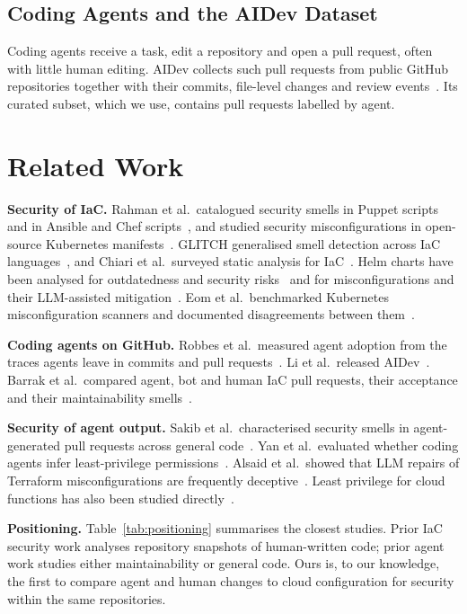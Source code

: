 \documentclass[10pt,conference]{IEEEtran}
\begin{document}
\subsection{Coding Agents and the AIDev Dataset}
Coding agents receive a task, edit a repository and open a pull request, often with little human editing. AIDev collects such pull requests from public GitHub repositories together with their commits, file-level changes and review events~\cite{li2026aidev}. Its curated subset, which we use, contains \NaidevTotal{} pull requests labelled by agent.

\section{Related Work}
\textbf{Security of IaC.} Rahman et al.\ catalogued security smells in Puppet scripts~\cite{rahman2019sins} and in Ansible and Chef scripts~\cite{rahman2021ansible}, and studied security misconfigurations in open-source Kubernetes manifests~\cite{rahman2023k8s}. GLITCH generalised smell detection across IaC languages~\cite{saavedra2022glitch}, and Chiari et al.\ surveyed static analysis for IaC~\cite{chiari2022survey}. Helm charts have been analysed for outdatedness and security risks~\cite{zerouali2023helm} and for misconfigurations and their LLM-assisted mitigation~\cite{minna2025helm}. Eom et al.\ benchmarked Kubernetes misconfiguration scanners and documented disagreements between them~\cite{eom2026scanners}.

\textbf{Coding agents on GitHub.} Robbes et al.\ measured agent adoption from the traces agents leave in commits and pull requests~\cite{robbes2026agentic}. Li et al.\ released AIDev~\cite{li2026aidev}. Barrak et al.\ compared agent, bot and human IaC pull requests, their acceptance and their maintainability smells~\cite{barrak2026agents}.

\textbf{Security of agent output.} Sakib et al.\ characterised security smells in agent-generated pull requests across general code~\cite{sakib2026trust}. Yan et al.\ evaluated whether coding agents infer least-privilege permissions~\cite{yan2026leastpriv}. Alsaid et al.\ showed that LLM repairs of Terraform misconfigurations are frequently deceptive~\cite{alsaid2026terraprobe}. Least privilege for cloud functions has also been studied directly~\cite{sankaran2020iam,shin2026alps}.

\textbf{Positioning.} Table~\ref{tab:positioning} summarises the closest studies. Prior IaC security work analyses repository snapshots of human-written code; prior agent work studies either maintainability or general code. Ours is, to our knowledge, the first to compare agent and human changes to cloud configuration for security within the same repositories.
\end{document}
